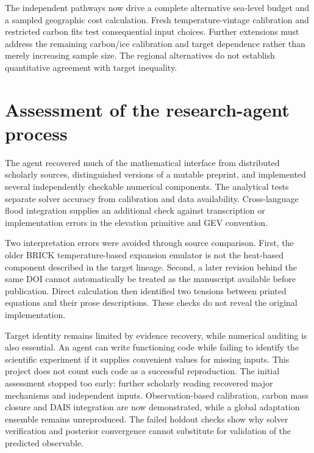 \documentclass[11pt]{article}
\begin{document}
The independent pathways now drive a complete alternative sea-level budget and
a sampled geographic cost calculation. Fresh temperature-vintage calibration
and restricted carbon fits test consequential input choices. Further extensions
must address the remaining carbon/ice calibration and target dependence rather
than merely increasing sample size. The regional alternatives do not establish
quantitative agreement with target inequality.

\section{Assessment of the research-agent process}

The agent recovered much of the mathematical interface from distributed
scholarly sources, distinguished versions of a mutable preprint, and implemented
several independently checkable numerical components. The analytical tests
separate solver accuracy from calibration and data availability. Cross-language
flood integration supplies an additional check against transcription or
implementation errors in the elevation primitive and GEV convention.

Two interpretation errors were avoided through source comparison. First, the
older BRICK temperature-based expansion emulator is not the heat-based component
described in the target lineage. Second, a later revision behind the same DOI
cannot automatically be treated as the manuscript available before publication.
Direct calculation then identified two tensions between printed equations and
their prose descriptions. These checks do not reveal the original implementation.

Target identity remains limited by evidence recovery, while numerical auditing
is also essential. An agent can write functioning code while failing to identify the scientific
experiment if it supplies convenient values for missing inputs. This project
does not count such code as a successful reproduction. The initial assessment
stopped too early: further scholarly reading recovered major mechanisms and
independent inputs. Observation-based calibration, carbon mass closure and DAIS
integration are now demonstrated, while a global adaptation ensemble remains
unreproduced. The failed holdout checks show why solver verification and posterior
convergence cannot substitute for validation of the predicted observable.
\end{document}
